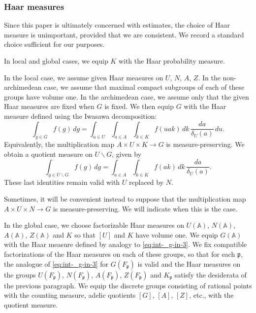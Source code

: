\documentclass[reqno]{amsart}
\theoremstyle{plain} \newtheorem{theorem} {Theorem}
\theoremstyle{definition} \newtheorem{definition} [theorem] {Definition}
\theoremstyle{itplain} %
\numberwithin{equation}{section}
\numberwithin{theorem}{section}
\begin{document}
\subsubsection{Haar measures}\label{sec:haar-measures}
Since this paper is ultimately concerned with estimates, the choice of Haar measure is unimportant, provided that we are consistent.  We record a standard choice sufficient for our purposes.

In local and global cases, we equip $K$ with the Haar probability measure.

In the local case, we assume given Haar measures on $U$, $N$, $A$, $Z$.  In the non-archimedean case, we assume that maximal compact subgroups of each of these groups have volume one.  In the archimedean case, we assume only that the given Haar measures are fixed when $G$ is fixed.  We then equip $G$ with the Haar measure defined using the Iwasawa decomposition:
\begin{equation}\label{eq:int-_g-in-3}
  \int _{g \in G} f(g) \, d g
  = \int _{u \in U}
  \int _{a \in A}
  \int _{k \in K}
  f(u a k)
  \, d k
  \, \frac{d a}{\delta_U(a)}
  \, d u.
\end{equation}
Equivalently, the multiplication map $A \times U \times K \rightarrow G$ is measure-preserving.  We obtain a quotient measure on $U \backslash G$, given by
\begin{equation}\label{eq:int-_g-in-U-bakslash-G}
  \int _{g \in U \backslash G} f(g) \, d g
  =
  \int _{a \in A}
  \int _{k \in K}
  f(a k)
  \, d k
  \, \frac{d a}{\delta_U(a)}.
\end{equation}
These last identities remain valid with $U$ replaced by $N$.

Sometimes, it will be convenient instead to suppose that the multiplication map $A \times U \times N \rightarrow G$ is measure-preserving.  We will indicate when this is the case.

In the global case, we choose factorizable Haar measures on $U(\mathbb{A})$, $N(\mathbb{A})$, $A(\mathbb{A})$, $Z(\mathbb{A})$ and $K$ so that $[U]$ and $K$ have volume one.  We equip $G(\mathbb{A})$ with the Haar measure defined by analogy to \eqref{eq:int-_g-in-3}.  We fix compatible factorizations of the Haar measures on each of these groups, so that for each $\mathfrak{p}$, the analogue of \eqref{eq:int-_g-in-3} for $G(F_\mathfrak{p})$ is valid and the Haar measures on the groups $U(F_\mathfrak{p})$, $N(F_\mathfrak{p})$, $A(F_\mathfrak{p})$, $Z(F_\mathfrak{p})$ and $K_\mathfrak{p}$ satisfy the desiderata of the previous paragraph.  We equip the discrete groups consisting of rational points with the counting measure, adelic quotients $[G]$, $[A]$, $[Z]$, etc., with the quotient measure.
\end{document}
